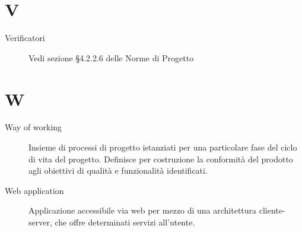 \documentclass{article}
\begin{document}
\section{V}
\begin{description}
  \item[Verificatori] Vedi sezione \S4.2.2.6 delle Norme di Progetto
\end{description}
\newpage
\section{W}
\begin{description}
  \item[Way of working] Insieme di processi di progetto istanziati per una particolare fase del ciclo di vita del progetto. Definisce per costruzione la conformità del prodotto agli obiettivi di qualità e funzionalità identificati.
  \item[Web application] Applicazione accessibile via web per mezzo di una architettura cliente-server, che offre determinati servizi all'utente.
\end{description}
\newpage
\end{document}
